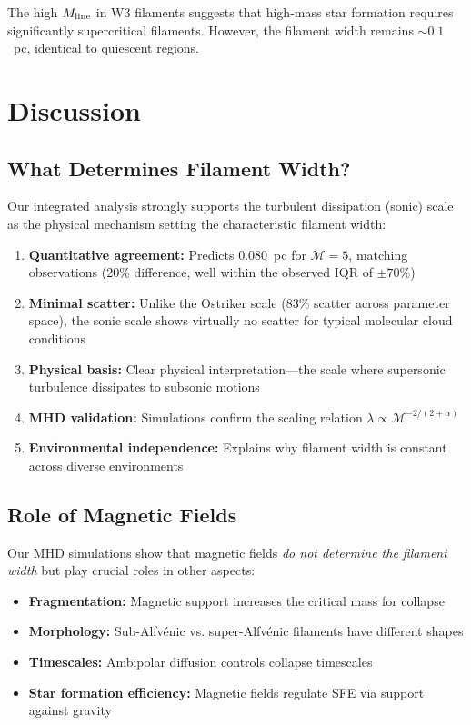\documentclass{mnras}
\begin{document}
The high $M_{\rm line}$ in W3 filaments suggests that high-mass star formation requires significantly supercritical filaments. However, the filament width remains $\sim 0.1$~pc, identical to quiescent regions.

\section{Discussion}
\label{sec:discussion}

\subsection{What Determines Filament Width?}

Our integrated analysis strongly supports the turbulent dissipation (sonic) scale as the physical mechanism setting the characteristic filament width:

\begin{enumerate}
  \item \textbf{Quantitative agreement:} Predicts $0.080$~pc for $\mathcal{M} = 5$, matching observations (20\% difference, well within the observed IQR of $\pm 70\%$)

  \item \textbf{Minimal scatter:} Unlike the Ostriker scale (83\% scatter across parameter space), the sonic scale shows virtually no scatter for typical molecular cloud conditions

  \item \textbf{Physical basis:} Clear physical interpretation---the scale where supersonic turbulence dissipates to subsonic motions

  \item \textbf{MHD validation:} Simulations confirm the scaling relation $\lambda \propto \mathcal{M}^{-2/(2+\alpha)}$

  \item \textbf{Environmental independence:} Explains why filament width is constant across diverse environments
\end{enumerate}

\subsection{Role of Magnetic Fields}

Our MHD simulations show that magnetic fields \textit{do not determine the filament width} but play crucial roles in other aspects:
\begin{itemize}
  \item \textbf{Fragmentation:} Magnetic support increases the critical mass for collapse
  \item \textbf{Morphology:} Sub-Alfv\'enic vs. super-Alfv\'enic filaments have different shapes
  \item \textbf{Timescales:} Ambipolar diffusion controls collapse timescales
  \item \textbf{Star formation efficiency:} Magnetic fields regulate SFE via support against gravity
\end{itemize}
\end{document}
